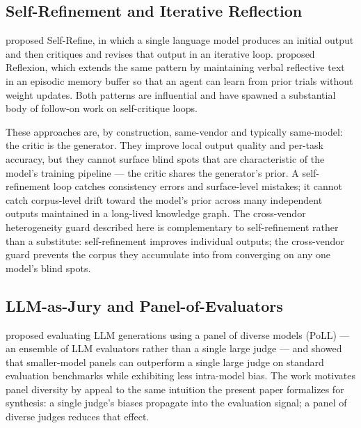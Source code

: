 \subsection{Self-Refinement and Iterative Reflection}

\citet{madaan2023self} proposed Self-Refine, in which a single language model produces an initial output and then critiques and revises that output in an iterative loop. \citet{shinn2023reflexion} proposed Reflexion, which extends the same pattern by maintaining verbal reflective text in an episodic memory buffer so that an agent can learn from prior trials without weight updates. Both patterns are influential and have spawned a substantial body of follow-on work on self-critique loops.

These approaches are, by construction, same-vendor and typically same-model: the critic is the generator. They improve local output quality and per-task accuracy, but they cannot surface blind spots that are characteristic of the model's training pipeline --- the critic shares the generator's prior. A self-refinement loop catches consistency errors and surface-level mistakes; it cannot catch corpus-level drift toward the model's prior across many independent outputs maintained in a long-lived knowledge graph. The cross-vendor heterogeneity guard described here is complementary to self-refinement rather than a substitute: self-refinement improves individual outputs; the cross-vendor guard prevents the corpus they accumulate into from converging on any one model's blind spots.

\subsection{LLM-as-Jury and Panel-of-Evaluators}

\citet{verga2024replacing} proposed evaluating LLM generations using a panel of diverse models (PoLL) --- an ensemble of LLM evaluators rather than a single large judge --- and showed that smaller-model panels can outperform a single large judge on standard evaluation benchmarks while exhibiting less intra-model bias. The work motivates panel diversity by appeal to the same intuition the present paper formalizes for synthesis: a single judge's biases propagate into the evaluation signal; a panel of diverse judges reduces that effect.

